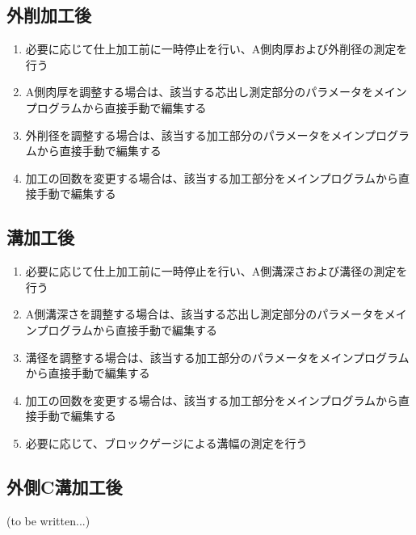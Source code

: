 \subsection{外削加工後}
\begin{enumerate}
\item 必要に応じて仕上加工前に一時停止を行い、A側肉厚および外削径の測定を行う
\item A側肉厚を調整する場合は、該当する芯出し測定部分のパラメータをメインプログラムから直接手動で編集する
\item 外削径を調整する場合は、該当する加工部分のパラメータをメインプログラムから直接手動で編集する
\item 加工の回数を変更する場合は、該当する加工部分をメインプログラムから直接手動で編集する
\end{enumerate}


\subsection{溝加工後}
\begin{enumerate}
\item 必要に応じて仕上加工前に一時停止を行い、A側溝深さおよび溝径の測定を行う
\item A側溝深さを調整する場合は、該当する芯出し測定部分のパラメータをメインプログラムから直接手動で編集する
\item 溝径を調整する場合は、該当する加工部分のパラメータをメインプログラムから直接手動で編集する
\item 加工の回数を変更する場合は、該当する加工部分をメインプログラムから直接手動で編集する
\item 必要に応じて、ブロックゲージによる溝幅の測定を行う
\end{enumerate}


\subsection{外側C溝加工後\TBW}
(to be written...)


